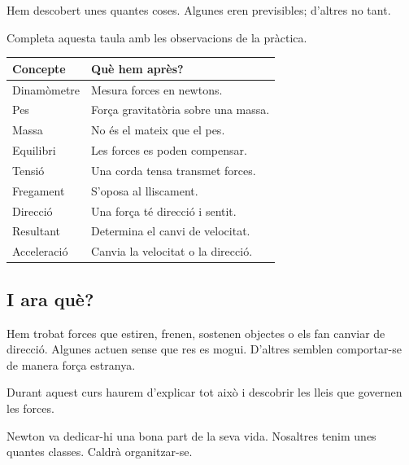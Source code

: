 Hem descobert unes quantes coses. Algunes eren previsibles; d'altres no tant.

Completa aquesta taula amb les observacions de la pràctica.

{\footnotesize
\setlength{\tabcolsep}{3pt}
\renewcommand{\arraystretch}{1.3}
\begin{center}
\begin{tabular}{|p{}|p{}|}
\hline
\textbf{Concepte} & \textbf{Què hem après?} \\ \hline
Dinamòmetre & Mesura forces en newtons. \\ \hline
Pes & Força gravitatòria sobre una massa. \\ \hline
Massa & No és el mateix que el pes. \\ \hline
Equilibri & Les forces es poden compensar. \\ \hline
Tensió & Una corda tensa transmet forces. \\ \hline
Fregament & S'oposa al lliscament. \\ \hline
Direcció & Una força té direcció i sentit. \\ \hline
Resultant & Determina el canvi de velocitat. \\ \hline
Acceleració & Canvia la velocitat o la direcció. \\ \hline
\end{tabular}
\end{center}
}

\subsection*{I ara què?}

Hem trobat forces que estiren, frenen, sostenen objectes o els fan canviar de direcció. Algunes actuen sense que res es mogui. D'altres semblen comportar-se de manera força estranya.

Durant aquest curs haurem d'explicar tot això i descobrir les lleis que governen les forces.

Newton va dedicar-hi una bona part de la seva vida. Nosaltres tenim unes quantes classes. Caldrà organitzar-se.
